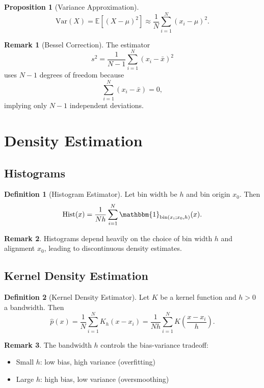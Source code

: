 \documentclass[12pt,oneside]{book}
\numberwithin{equation}{section}
\theoremstyle{definition}
\newtheorem{definition}{Definition}[section]
\newtheorem{remark}{Remark}[section]
\theoremstyle{plain}
\newtheorem{proposition}{Proposition}[section]
\theoremstyle{remark}
\newcommand{\E}{\mathbb{E}}
\newcommand{\Var}{\mathrm{Var}}
\newcommand{\ind}{\mathbbm{1}}
\begin{document}
\begin{proposition}[Variance Approximation]
\[
\Var(X) = \E[(X-\mu)^2] \approx \frac{1}{N}\sum_{i=1}^N (x_i - \mu)^2.
\]
\end{proposition}

\begin{remark}[Bessel Correction]
The estimator
\[
s^2 = \frac{1}{N-1}\sum_{i=1}^N (x_i - \bar{x})^2
\]
uses $N-1$ degrees of freedom because
\[
\sum_{i=1}^N (x_i - \bar{x}) = 0,
\]
implying only $N-1$ independent deviations.
\end{remark}

\section{Density Estimation}

\subsection{Histograms}

\begin{definition}[Histogram Estimator]
Let bin width be $h$ and bin origin $x_0$. Then
\[
\mathrm{Hist}(x) = \frac{1}{Nh}\sum_{i=1}^N \ind_{\mathrm{bin}(x_i; x_0, h)}(x).
\]
\end{definition}

\begin{remark}
Histograms depend heavily on the choice of bin width $h$ and alignment $x_0$, leading to discontinuous density estimates.
\end{remark}

\subsection{Kernel Density Estimation}

\begin{definition}[Kernel Density Estimator]
Let $K$ be a kernel function and $h>0$ a bandwidth. Then
\[
\widehat{p}(x) = \frac{1}{N}\sum_{i=1}^N K_h(x - x_i)
= \frac{1}{Nh}\sum_{i=1}^N K\left(\frac{x - x_i}{h}\right).
\]
\end{definition}

\begin{remark}
The bandwidth $h$ controls the bias-variance tradeoff:
\begin{itemize}
    \item Small $h$: low bias, high variance (overfitting)
    \item Large $h$: high bias, low variance (oversmoothing)
\end{itemize}
\end{remark}
\end{document}
